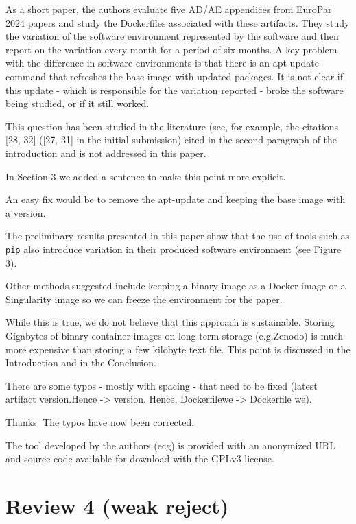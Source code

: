 \documentclass[%
	11pt,
	final,
]{article}
\makeatletter
\newcommand{\eg}{e.g.\@}
\makeatother
\begin{document}
As a short paper, the authors evaluate five AD/AE appendices from EuroPar 2024 papers and study the Dockerfiles associated with these artifacts.
They study the variation of the software environment represented by the software and then report on the variation every month for a period of six months.
A key problem with the difference in software environments is that there is an apt-update command that refreshes the base image with updated packages.
It is not clear if this update - which is responsible for the variation reported - broke the software being studied, or if it still worked.
\begin{review-answer}
  This question has been studied in the literature (see, for example, the citations [28, 32] ([27, 31] in the initial submission) cited in the second paragraph of the introduction and is not addressed in this paper.

In Section 3 we added a sentence to make this point more explicit.
\end{review-answer}

An easy fix would be to remove the apt-update and keeping the base image with a version.
\begin{review-answer}
  The preliminary results presented in this paper show that the use of tools such as \texttt{pip} also introduce variation in their produced software environment (see Figure 3).
\end{review-answer}
Other methods suggested include keeping a binary image as a Docker image or a Singularity image so we can freeze the environment for the paper.
\begin{review-answer}
  While this is true, we do not believe that this approach is sustainable.
  Storing Gigabytes of binary container images on long-term storage (\eg Zenodo) is much more expensive than storing a few kilobyte text file.
  This point is discussed in the Introduction and in the Conclusion.
\end{review-answer}
There are some typos - mostly with spacing - that need to be fixed (latest artifact version.Hence -> version. Hence, Dockerfilewe -> Dockerfile we).
\begin{review-answer}
  Thanks. The typos have now been corrected.
\end{review-answer}
The tool developed by the authors (ecg) is provided with an anonymized URL and source code available for download with the GPLv3 license.


\section{Review 4 (weak reject)}
\end{document}
